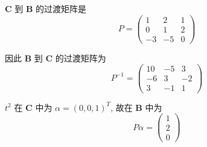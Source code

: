 \documentclass{article}
\begin{document}
$\mathbf{C}$ 到 $\mathbf{B}$ 的过渡矩阵是 
\[
    P = 
    \begin{pmatrix}
        1 & 2 & 1 \\
        0 & 1 & 2 \\
        -3 & -5 & 0
    \end{pmatrix}
\]

因此 $\mathbf{B}$ 到 $\mathbf{C}$ 的过渡矩阵为
\[
    P^{-1} = 
    \begin{pmatrix}
        10 & -5 & 3 \\
        -6 & 3 & -2 \\
        3 & -1 & 1
    \end{pmatrix}
\]

$t^2$ 在 $\mathbf{C}$ 中为 $\alpha = (0, 0, 1)^T$, 故在 $\mathbf{B}$ 中为
\[
    P\alpha = 
    \begin{pmatrix}
        1 \\ 2 \\ 0
    \end{pmatrix}
\]

\section{}
\end{document}
